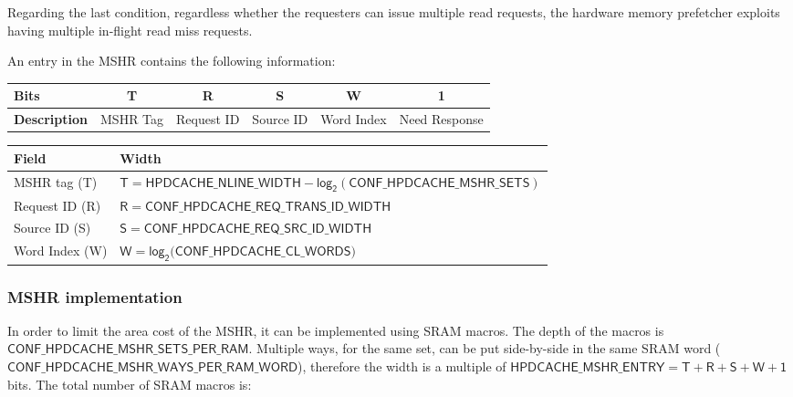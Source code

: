 \documentclass[10pt,titlepage,twoside]{book}
\begin{document}
\begin{tcolorbox}[colback=red!10!white,
                  colframe=white!10!red,
                  title=\textbf{Important},
                  center, valign=top, halign=left,
                  center title,
                  width=.950\linewidth]
Regarding the last condition, regardless whether the requesters can issue multiple read requests, the hardware memory prefetcher exploits having multiple in-flight read miss requests.
\end{tcolorbox}

An entry in the \ac{MSHR} contains the following information:

\begin{center}
\begin{tabular}{lccccc}
\toprule%
{\bf Bits} &%
T &%
R &%
S &%
W &%
1 \\
\midrule
{\bf Description} &%
MSHR Tag &%
Request ID &%
Source ID &%
Word Index &%
Need Response\\
\end{tabular}

\begin{tabular}{ll}
\toprule%
{\bf Field} &%
{\bf Width} \\
\midrule%
MSHR tag (T) &%
$\mathsf{T = HPDCACHE\_NLINE\_WIDTH - log_2(CONF\_HPDCACHE\_MSHR\_SETS)}$ \\
\midrule%
Request ID (R) &%
$\mathsf{R = CONF\_HPDCACHE\_REQ\_TRANS\_ID\_WIDTH}$ \\
\midrule%
Source ID (S) &%
$\mathsf{S = CONF\_HPDCACHE\_REQ\_SRC\_ID\_WIDTH}$ \\
\midrule%
Word Index (W) &%
$\mathsf{W = log_2(CONF\_HPDCACHE\_CL\_WORDS})$ \\
\end{tabular}
\end{center}

\subsubsection{\acs*{MSHR} implementation}

In order to limit the area cost of the \ac{MSHR}, it can be implemented using SRAM macros.
The depth of the macros is $\mathsf{CONF\_HPDCACHE\_MSHR\_SETS\_PER\_RAM}$.
Multiple ways, for the same set, can be put side-by-side in the same SRAM word ($\mathsf{CONF\_HPDCACHE\_MSHR\_WAYS\_PER\_RAM\_WORD}$), therefore the width is a multiple of $\mathsf{HPDCACHE\_MSHR\_ENTRY = T + R + S + W + 1}$ bits.
The total number of SRAM macros is:
\end{document}
